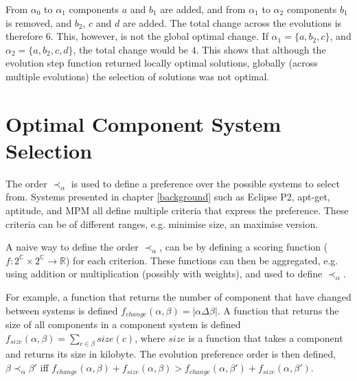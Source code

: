 From $\alpha_0$ to $\alpha_1$ components $a$ and $b_1$ are added, 
and from $\alpha_1$ to $\alpha_2$ components $b_1$ is removed, and $b_2$, $c$ and $d$ are added.
The total change across the evolutions is therefore $6$.
This, however, is not the global optimal change.
If $\alpha_1 = \{a,b_2,c\}$, and $\alpha_2 = \{a,b_2,c,d\}$, the total change would be $4$.
This shows that although the evolution step function returned locally optimal solutions,
globally (across multiple evolutions) the selection of solutions was not optimal.

 
\section{Optimal Component System Selection}
\label{formal.opt}
The order $\prec_{\alpha}$ is used to define a preference over the possible systems to select from.
Systems presented in chapter \ref{background} such as Eclipse P2, apt-get, aptitude, and MPM all define multiple criteria that express the preference.
These criteria can be of different ranges, e.g. minimise size, an maximise version. 

A naive way to define the order $\prec_{\alpha}$, can be by defining a scoring function ($f: 2^{\mathbb{C}} \times 2^{\mathbb{C}} \rightarrow \mathbb{R}$) for each criterion. 
These functions can then be aggregated, e.g. using addition or multiplication (possibly with weights), and used to define $\prec_{\alpha}$.

For example, a function that returns the number of component that have changed between systems is defined $f_{change}(\alpha,\beta) = |\alpha \Delta \beta|$.
A function that returns the size of all components in a component system is defined $f_{size}(\alpha,\beta) = \sum \limits_{c \in \beta} size(c)$,
 where $size$ is a function that takes a component and returns its size in kilobyte.
The evolution preference order is then defined, $\beta \prec_{\alpha} \beta'$ iff $f_{change}(\alpha,\beta) + f_{size}(\alpha,\beta) > f_{change}(\alpha,\beta') + f_{size}(\alpha,\beta')$.

